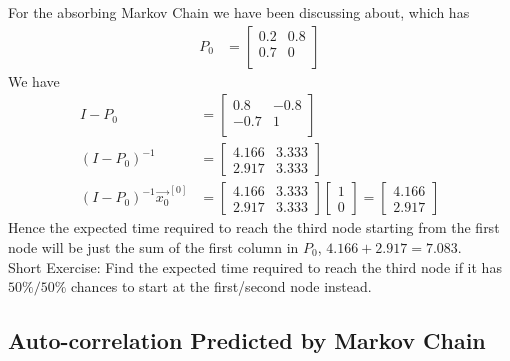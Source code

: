 \begin{exmp}
For the absorbing Markov Chain we have been discussing about, which has
\begin{align*}
P_0 &= 
\begin{bmatrix}
0.2 & 0.8\\
0.7 & 0 \\
\end{bmatrix}   
\end{align*}
We have
\begin{align*}
I - P_0 &= 
\begin{bmatrix}
0.8 & -0.8\\
-0.7 & 1 \\
\end{bmatrix} \\
(I - P_0)^{-1} &= 
\begin{bmatrix}
4.166 & 3.333 \\
2.917 & 3.333
\end{bmatrix} \\
(I - P_0)^{-1}\vec{x_0}^{[0]} &= 
\begin{bmatrix}
4.166 & 3.333 \\
2.917 & 3.333
\end{bmatrix}
\begin{bmatrix}
1 \\
0
\end{bmatrix} 
=
\begin{bmatrix}
4.166 \\
2.917
\end{bmatrix}
\end{align*}
Hence the expected time required to reach the third node starting from the first node will be just the sum of the first column in $P_0$, $4.166 + 2.917 = 7.083$.\\
Short Exercise: Find the expected time required to reach the third node if it has $50\%/50\%$ chances to start at the first/second node instead.
\end{exmp}

\subsection{Auto-correlation Predicted by Markov Chain}

